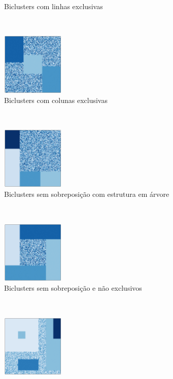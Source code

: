 \documentclass[normaltoc, espacoumemeio, pnumromarab,ruledheader]{abnt}
\begin{document}
\begin{figure}[h]
\begin{subfigure}[b]{0.3\textwidth}
            \caption{Biclusters com linhas exclusivas}
            \label{fig:bicstruct-d}
    \end{subfigure}
    ~
    \centering
    \begin{subfigure}[b]{0.3\textwidth}
            \includegraphics[width=30mm]{img/e-bic-struct.png}
            \caption{Biclusters com colunas exclusivas}
            \label{fig:bicstruct-e}
    \end{subfigure}
    ~
    \centering
    \begin{subfigure}[b]{0.3\textwidth}
            \includegraphics[width=30mm]{img/f-bic-struct.png}
            \caption{Biclusters sem sobreposição com estrutura em árvore}
            \label{fig:bicstruct-f}
    \end{subfigure}
    ~
    \centering
    \begin{subfigure}[b]{0.3\textwidth}
            \includegraphics[width=30mm]{img/g-bic-struct.png}
            \caption{Biclusters sem sobreposição e não exclusivos}
            \label{fig:bicstruct-g}
    \end{subfigure}
    ~
    \centering
    \begin{subfigure}[b]{0.3\textwidth}
            \includegraphics[width=30mm]{img/h-bic-struct.png}

\end{subfigure}
\end{figure}
\end{document}
